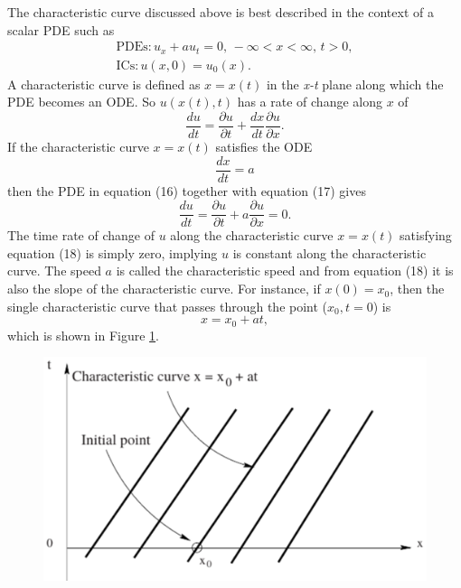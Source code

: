 \documentclass[]{article}
\begin{document}
		The characteristic curve discussed above is best described in the context of a scalar PDE such as
		\begin{equation}
			\begin{aligned}
			\mbox{PDEs} : u_x + au_t = 0 \mbox{, } -\infty < x < \infty \mbox{, } t > 0, \\
			\mbox{ICs}: u(x,0) = u_0(x).		
			\end{aligned}			
		\end{equation}
		A characteristic curve is defined as $ x = x(t) $ in the \textit{x-t} plane along which the PDE becomes an ODE. So $ u(x(t),t) $ has a rate of change along $ x $ of 
		\begin{equation}
			\frac{du}{dt} = \frac{\partial u}{\partial t} + \frac{dx}{dt}\frac{\partial u}{\partial x}.
		\end{equation}
		If the characteristic curve $ x = x(t) $ satisfies the ODE
		\begin{equation}
			\frac{dx}{dt} = a
		\end{equation}
		then the PDE in equation (16) together with equation (17) gives
		\begin{equation}
			\frac{du}{dt} = \frac{\partial u}{\partial t} + a \frac{\partial u}{\partial x} = 0. 
		\end{equation}
		The time rate of change of $ u $ along the characteristic curve $ x = x(t) $ satisfying equation (18) is simply zero, implying $ u $ is constant along the characteristic curve. The speed $ a $ is called the characteristic speed and from equation (18) it is also the slope of the characteristic curve. For instance, if $ x(0) = x_0$, then the single characteristic curve that passes through the point ($ x_0, t=0 $) is
		\begin{equation}
			x = x_0 + at,
		\end{equation}
		which is shown in Figure \ref{CharacteristicCurve}.
		\begin{figure}[h] 	
			\centering
			\includegraphics[scale=.50]{CharacteristicCurve}
			\caption{}
			\label{CharacteristicCurve}
		\end{figure} 	
\end{document}
